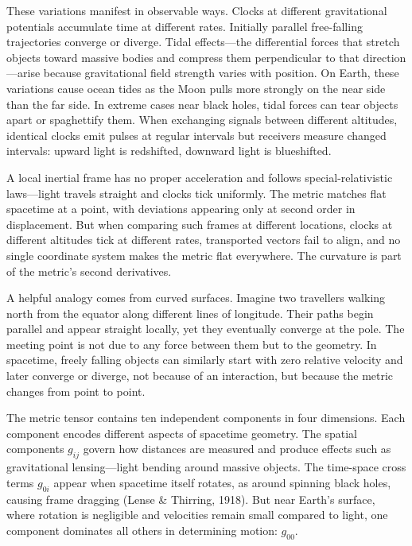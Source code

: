 These variations manifest in observable ways. Clocks at different gravitational potentials accumulate time at different rates. Initially parallel free-falling trajectories converge or diverge. Tidal effects—the differential forces that stretch objects toward massive bodies and compress them perpendicular to that direction—arise because gravitational field strength varies with position. On Earth, these variations cause ocean tides as the Moon pulls more strongly on the near side than the far side. In extreme cases near black holes, tidal forces can tear objects apart or spaghettify them. When exchanging signals between different altitudes, identical clocks emit pulses at regular intervals but receivers measure changed intervals: upward light is redshifted, downward light is blueshifted.

A local inertial frame has no proper acceleration and follows special-relativistic laws—light travels straight and clocks tick uniformly. The metric matches flat spacetime at a point, with deviations appearing only at second order in displacement. But when comparing such frames at different locations, clocks at different altitudes tick at different rates, transported vectors fail to align, and no single coordinate system makes the metric flat everywhere. The curvature is part of the metric's second derivatives.

A helpful analogy comes from curved surfaces. Imagine two travellers walking north from the equator along different lines of longitude. Their paths begin parallel and appear straight locally, yet they eventually converge at the pole. The meeting point is not due to any force between them but to the geometry. In spacetime, freely falling objects can similarly start with zero relative velocity and later converge or diverge, not because of an interaction, but because the metric changes from point to point.

The metric tensor contains ten independent components in four dimensions. Each component encodes different aspects of spacetime geometry. The spatial components \( g_{ij} \) govern how distances are measured and produce effects such as gravitational lensing—light bending around massive objects. The time-space cross terms \( g_{0i} \) appear when spacetime itself rotates, as around spinning black holes, causing frame dragging (Lense \& Thirring, 1918). But near Earth's surface, where rotation is negligible and velocities remain small compared to light, one component dominates all others in determining motion: \( g_{00} \).


